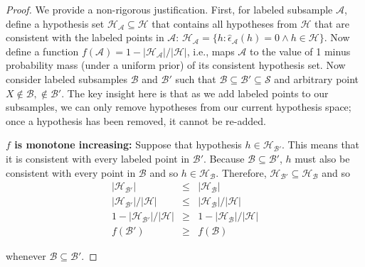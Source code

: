 \begin{proof}
We provide a non-rigorous justification. First, for labeled subsample $\mathcal{A}$, define a hypothesis set $\mathcal{H}_{\mathcal{A}} \subseteq \mathcal{H}$ that contains all hypotheses from $\mathcal{H}$ that are consistent with the labeled points in $\mathcal{A}$: $\mathcal{H}_{\mathcal{A}} = \{h : \hat{\epsilon}_{\mathcal{A}}(h)=0 \wedge h \in \mathcal{H}\}$. Now define a function $f(\mathcal{A}) = 1-|\mathcal{H}_{\mathcal{A}}| / |\mathcal{H}|$, i.e., maps $\mathcal{A}$ to the value of 1 minus probability mass (under a uniform prior) of its consistent hypothesis set. Now consider labeled subsamples $\mathcal{B}$ and $\mathcal{B}'$ such that $\mathcal{B} \subseteq \mathcal{B}' \subseteq \mathcal{S}$ and arbitrary point $X \not\in \mathcal{B}, \not\in \mathcal{B}'$. The key insight here is that as we add labeled points to our subsamples, we can only remove hypotheses from our current hypothesis space; once a hypothesis has been removed, it cannot be re-added.

\textbf{$f$ is monotone increasing:} Suppose that hypothesis $h \in \mathcal{H}_{\mathcal{B}'}$. This means that it is consistent with every labeled point in $\mathcal{B}'$. Because $\mathcal{B} \subseteq \mathcal{B}'$, $h$ must also be consistent with every point in $\mathcal{B}$ and so $h \in \mathcal{H}_{\mathcal{B}}$. Therefore, $\mathcal{H}_{\mathcal{B}'} \subseteq \mathcal{H}_{\mathcal{B}}$ and so
\begin{eqnarray*}
|\mathcal{H}_{\mathcal{B}'}| &\leq& |\mathcal{H}_{\mathcal{B}}| \\
|\mathcal{H}_{\mathcal{B}'}| / |\mathcal{H}| &\leq& |\mathcal{H}_{\mathcal{B}}| / |\mathcal{H}| \\
1-|\mathcal{H}_{\mathcal{B}'}| / |\mathcal{H}| &\geq& 1-|\mathcal{H}_{\mathcal{B}}| / |\mathcal{H}| \\
f(\mathcal{B}') &\geq& f(\mathcal{B})
\end{eqnarray*}

\noindent whenever $\mathcal{B} \subseteq \mathcal{B}'$.


\end{proof}

